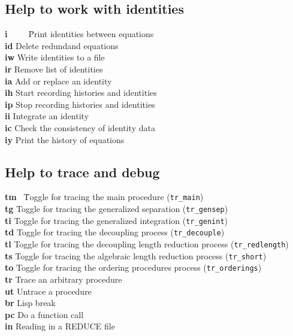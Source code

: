 \documentclass[12pt]{article}
\begin{document}
\subsection{Help to work with identities} 
\begin{tabbing}
  {\bf i}\ \ \ \ \ \= Print identities between equations \\
  {\bf id}   \> Delete redundand equations \\
  {\bf iw}   \> Write identities to a file \\
  {\bf ir}   \> Remove list of identities \\
  {\bf ia}   \> Add or replace an identity \\
  {\bf ih}   \> Start recording histories and identities \\
  {\bf ip}   \> Stop recording histories and identities \\
  {\bf ii}   \> Integrate an identity \\
  {\bf ic}   \> Check the consistency of identity data \\
  {\bf iy}   \> Print the history of equations
\end{tabbing}

\subsection{Help to trace and debug}
\begin{tabbing}
  {\bf tm}  \ \= Toggle for tracing the main procedure ({\tt tr\_main}) \\
  {\bf tg}    \> Toggle for tracing the generalized separation
                        ({\tt tr\_gensep}) \\
  {\bf ti}    \> Toggle for tracing the generalized integration  
                        ({\tt tr\_genint})  \\
  {\bf td}    \> Toggle for tracing the decoupling process
                        ({\tt tr\_decouple}) \\
  {\bf tl}    \> Toggle for tracing the decoupling length reduction
                        process ({\tt tr\_redlength}) \\
  {\bf ts}    \> Toggle for tracing the algebraic length reduction
                        process ({\tt tr\_short}) \\
  {\bf to}    \> Toggle for tracing the ordering procedures
                        process ({\tt tr\_orderings}) \\
  {\bf tr}    \> Trace an arbitrary procedure \\
  {\bf ut}    \> Untrace a procedure \\
  {\bf br}    \> Lisp break          \\                 
  {\bf pc}    \> Do a function call  \\
  {\bf in}    \> Reading in a REDUCE file
\end{tabbing}
\end{document}
